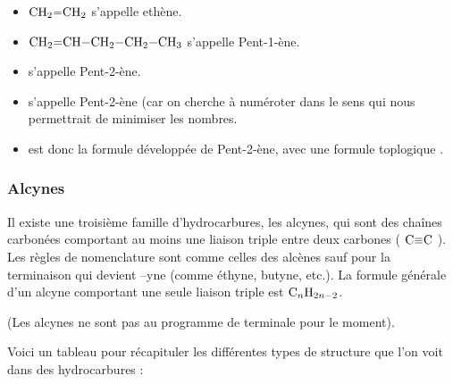 \documentclass[11pt,a4paper]{article}
\begin{document}
\begin{eg}
\begin{itemize}
    \item $\ce{CH2=CH2}$ s'appelle ethène.
    \item $\ce{CH2=CH-CH2-CH2-CH3}$ s'appelle Pent-1-ène.
    \item {} s'appelle Pent-2-ène.
    \item {} s'appelle Pent-2-ène (car on cherche à numéroter dans le sens qui nous permettrait de minimiser les nombres.
    \item {} est donc la formule développée de Pent-2-ène, avec une formule toplogique \chemfig{
     -[:30]%
    -[:330]%
     =[:30]%
    -[:330]%
}.
\end{itemize}
\end{eg}

\subsubsection{Alcynes}
Il existe une troisième famille d’hydrocarbures, les alcynes, qui sont des chaînes carbonées comportant au moins une liaison triple entre deux carbones ( $\ce{C#C}$ ). Les règles de nomenclature sont comme celles des alcènes sauf pour la terminaison qui devient –yne (comme éthyne, butyne, etc.).  La formule générale d’un alcyne comportant une seule liaison triple est $\ce{C_nH_{2n-2}}$. 

(Les alcynes ne sont pas au programme de terminale pour le moment). 
\vspace{1cm}

Voici un tableau pour récapituler les différentes types de structure que l'on voit dans des hydrocarbures : 
\end{document}
